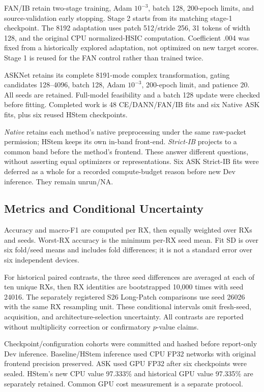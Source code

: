 \documentclass[journal]{IEEEtran}
\begin{document}
FAN/IB retain two-stage training, Adam $10^{-3}$, batch 128, 200-epoch limits, and source-validation early stopping. Stage 2 starts from its matching stage-1 checkpoint. The 8192 adaptation uses patch 512/stride 256, 31 tokens of width 128, and the original CPU normalized-HSIC computation. Coefficient .004 was fixed from a historically explored adaptation, not optimized on new target scores. Stage 1 is reused for the FAN control rather than trained twice.

ASKNet retains its complete 8191-mode complex transformation, gating candidates 128--4096, batch 128, Adam $10^{-3}$, 200-epoch limit, and patience 20. All seeds are retained. Full-model feasibility and a batch 128 update were checked before fitting. Completed work is 48 CE/DANN/FAN/IB fits and six Native ASK fits, plus six reused HStem checkpoints.

\emph{Native} retains each method's native preprocessing under the same raw-packet permission; HStem keeps its own in-band front-end. \emph{Strict-IB} projects to a common band before the method's frontend. These answer different questions, without asserting equal optimizers or representations. Six ASK Strict-IB fits were deferred as a whole for a recorded compute-budget reason before new Dev inference. They remain unrun/NA.

\subsection{Metrics and Conditional Uncertainty}
Accuracy and macro-F1 are computed per RX, then equally weighted over RXs and seeds. Worst-RX accuracy is the minimum per-RX seed mean. Fit SD is over six fold/seed means and includes fold differences; it is not a standard error over six independent devices.

For historical paired contrasts, the three seed differences are averaged at each of ten unique RXs, then RX identities are bootstrapped 10,000 times with seed 24016. The separately registered S26 Long-Patch comparisons use seed 26026 with the same RX resampling unit. These conditional intervals omit fresh-seed, acquisition, and architecture-selection uncertainty. All contrasts are reported without multiplicity correction or confirmatory $p$-value claims.

Checkpoint/configuration cohorts were committed and hashed before report-only Dev inference. Baseline/HStem inference used CPU FP32 networks with original frontend precision preserved. ASK used GPU FP32 after six checkpoints were sealed. HStem's new CPU value 97.333\% and historical GPU value 97.335\% are separately retained. Common GPU cost measurement is a separate protocol.
\end{document}
